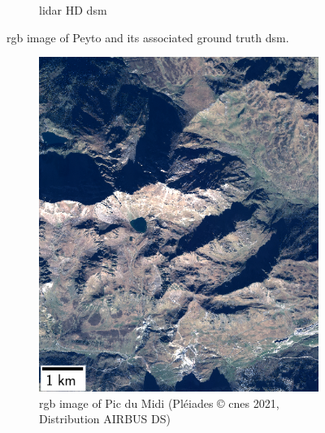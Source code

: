 \begin{figure}
\begin{subfigure}[t]{0.48\linewidth}
        \caption{\acrshort{lidar} HD \acrshort{dsm}}
        \label{fig:miniature_Peyto_gt}
    \end{subfigure}
    \caption{\acrshort{rgb} image of Peyto and its associated ground truth \acrshort{dsm}.}
    \label{fig:miniature_Peyto}
\end{figure}

\begin{figure}
    \centering
    \begin{subfigure}[t]{0.48\linewidth}
        \flushleft
        \includegraphics[width=\linewidth]{Images/Chap_6/miniature_Pic_du_midi.png}
        \caption{\acrshort{rgb} image of Pic du Midi (Pléiades © \acrshort{cnes} 2021, Distribution AIRBUS DS)}
        \label{fig:miniature_pic_du_midi_rgb}
    \end{subfigure}\hfill
    \begin{subfigure}[t]{0.48\linewidth}
        \flushright

\end{subfigure}
\end{figure}

